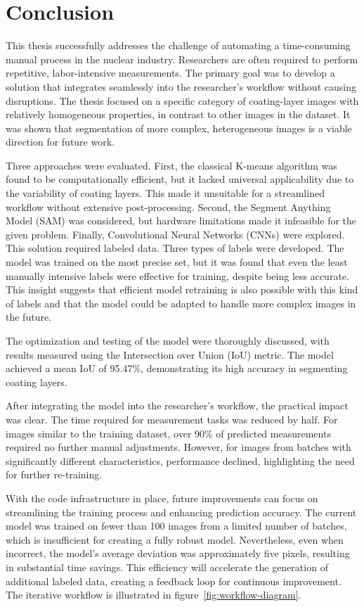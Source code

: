 \chapter{Conclusion}

This thesis successfully addresses the challenge of automating a time-consuming manual process in the nuclear industry. Researchers are often required to perform repetitive, labor-intensive measurements. The primary goal was to develop a solution that integrates seamlessly into the researcher’s workflow without causing disruptions. The thesis focused on a specific category of coating-layer images with relatively homogeneous properties, in contrast to other images in the dataset. It was shown that segmentation of more complex, heterogeneous images is a viable direction for future work.

Three approaches were evaluated. First, the classical K-means algorithm was found to be computationally efficient, but it lacked universal applicability due to the variability of coating layers. This made it unsuitable for a streamlined workflow without extensive post-processing. Second, the Segment Anything Model (SAM) was considered, but hardware limitations made it infeasible for the given problem. Finally, Convolutional Neural Networks (CNNs) were explored. This solution required labeled data. Three types of labels were developed. The model was trained on the most precise set, but it was found that even the least manually intensive labels were effective for training, despite being less accurate. This insight suggests that efficient model retraining is also possible with this kind of labels and that the model could be adapted to handle more complex images in the future.

The optimization and testing of the model were thoroughly discussed, with results measured using the Intersection over Union (IoU) metric. The model achieved a mean IoU of 95.47\%, demonstrating its high accuracy in segmenting coating layers.

After integrating the model into the researcher’s workflow, the practical impact was clear. The time required for measurement tasks was reduced by half. For images similar to the training dataset, over 90\% of predicted measurements required no further manual adjustments. However, for images from batches with significantly different characteristics, performance declined, highlighting the need for further re-training.

With the code infrastructure in place, future improvements can focus on streamlining the training process and enhancing prediction accuracy. The current model was trained on fewer than 100 images from a limited number of batches, which is insufficient for creating a fully robust model. Nevertheless, even when incorrect, the model's average deviation was approximately five pixels, resulting in substantial time savings. This efficiency will accelerate the generation of additional labeled data, creating a feedback loop for continuous improvement. The iterative workflow is illustrated in figure~\ref{fig:workflow-diagram}.

